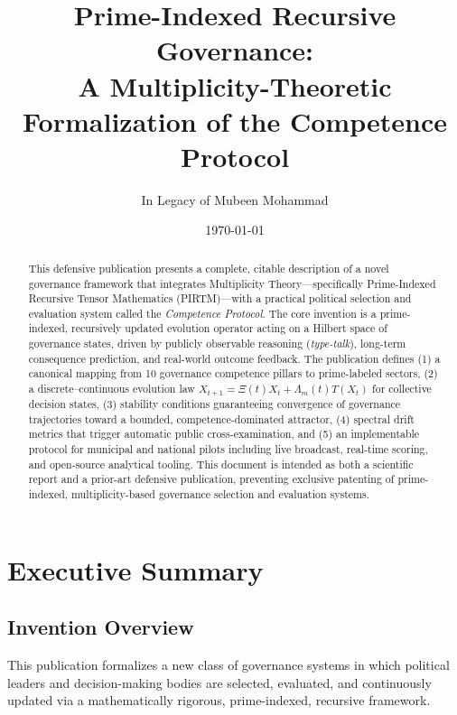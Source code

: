 \documentclass[11pt]{article}
\title{Prime-Indexed Recursive Governance:\\
A Multiplicity-Theoretic Formalization of the Competence Protocol}
\author{In Legacy of Mubeen Mohammad}}
\affil{Citizen Gardens \\ The Foundation of Multiplicity}
\date{\today}
\begin{document}
\maketitle

\begin{abstract}
This defensive publication presents a complete, citable description of a novel governance framework that integrates Multiplicity Theory---specifically Prime-Indexed Recursive Tensor Mathematics (PIRTM)---with a practical political selection and evaluation system called the \emph{Competence Protocol}. The core invention is a prime-indexed, recursively updated evolution operator acting on a Hilbert space of governance states, driven by publicly observable reasoning (\emph{type-talk}), long-term consequence prediction, and real-world outcome feedback. The publication defines (1) a canonical mapping from 10 governance competence pillars to prime-labeled sectors, (2) a discrete--continuous evolution law \(X_{t+1} = \Xi(t) X_t + \Lambda_m(t) T(X_t)\) for collective decision states, (3) stability conditions guaranteeing convergence of governance trajectories toward a bounded, competence-dominated attractor, (4) spectral drift metrics that trigger automatic public cross-examination, and (5) an implementable protocol for municipal and national pilots including live broadcast, real-time scoring, and open-source analytical tooling. This document is intended as both a scientific report and a prior-art defensive publication, preventing exclusive patenting of prime-indexed, multiplicity-based governance selection and evaluation systems.
\end{abstract}
\newpage
\tableofcontents
\newpage
\section{Executive Summary}

\subsection{Invention Overview}

This publication formalizes a new class of governance systems in which political leaders and decision-making bodies are selected, evaluated, and continuously updated via a mathematically rigorous, prime-indexed, recursive framework.
\end{document}
